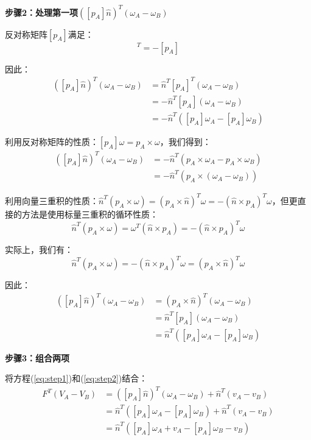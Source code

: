 \documentclass[12pt,a4paper]{article}
\begin{document}
\textbf{步骤2：处理第一项$([p_A]\hat{n})^T (\omega_A - \omega_B)$}

反对称矩阵$[p_A]$满足：
\begin{equation}
[p_A]^T = -[p_A]
\end{equation}

因此：
\begin{align}
([p_A]\hat{n})^T (\omega_A - \omega_B) &= \hat{n}^T [p_A]^T (\omega_A - \omega_B) \\
&= -\hat{n}^T [p_A] (\omega_A - \omega_B) \\
&= -\hat{n}^T ([p_A] \omega_A - [p_A] \omega_B)
\end{align}

利用反对称矩阵的性质：$[p_A] \omega = p_A \times \omega$，我们得到：
\begin{align}
([p_A]\hat{n})^T (\omega_A - \omega_B) &= -\hat{n}^T (p_A \times \omega_A - p_A \times \omega_B) \\
&= -\hat{n}^T (p_A \times (\omega_A - \omega_B))
\end{align}

利用向量三重积的性质：$\hat{n}^T (p_A \times \omega) = (p_A \times \hat{n})^T \omega = -(\hat{n} \times p_A)^T \omega$，但更直接的方法是使用标量三重积的循环性质：
\begin{equation}
\hat{n}^T (p_A \times \omega) = \omega^T (\hat{n} \times p_A) = -(\hat{n} \times p_A)^T \omega
\end{equation}

实际上，我们有：
\begin{equation}
\hat{n}^T (p_A \times \omega) = -(\hat{n} \times p_A)^T \omega = (p_A \times \hat{n})^T \omega
\end{equation}

因此：
\begin{align}
([p_A]\hat{n})^T (\omega_A - \omega_B) &= (p_A \times \hat{n})^T (\omega_A - \omega_B) \\
&= \hat{n}^T [p_A] (\omega_A - \omega_B) \\
&= \hat{n}^T ([p_A] \omega_A - [p_A] \omega_B)
\label{eq:step2}
\end{align}

\textbf{步骤3：组合两项}

将方程(\ref{eq:step1})和(\ref{eq:step2})结合：
\begin{align}
F^T (V_A - V_B) &= ([p_A]\hat{n})^T (\omega_A - \omega_B) + \hat{n}^T (v_A - v_B) \\
&= \hat{n}^T ([p_A] \omega_A - [p_A] \omega_B) + \hat{n}^T (v_A - v_B) \\
&= \hat{n}^T ([p_A] \omega_A + v_A - [p_A] \omega_B - v_B)
\end{align}
\end{document}
